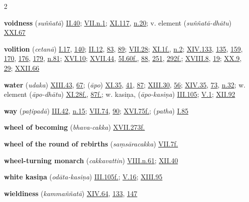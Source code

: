 \begin{multicols}{2}
\begin{vismHanging}
\par\textbf{voidness} (\emph{suññatā}) \hyperlink{II.40}{II.40}{}; \hyperlink{VII.n1}{VII.n.1}{}; \hyperlink{XI.117}{XI.117}{}, \hyperlink{XI.n20}{n.20}{}; v. element (\emph{suññatā-dhātu}) \hyperlink{XXI.67}{XXI.67}{}
\par\textbf{volition} (\emph{cetanā}) \hyperlink{I.17}{I.17}{}, \hyperlink{I.140}{140}{}; \hyperlink{II.12}{II.12}{}, \hyperlink{II.83}{83}{}, \hyperlink{II.89}{89}{}; \hyperlink{VII.28}{VII.28}{}; \hyperlink{XI.1}{XI.1f.}{}, \hyperlink{XI.n2}{n.2}{}; \hyperlink{XIV.133}{XIV.133}{}, \hyperlink{XIV.135}{135}{}, \hyperlink{XIV.159}{159}{}, \hyperlink{XIV.170}{170}{}, \hyperlink{XIV.176}{176}{}, \hyperlink{XIV.179}{179}{}, \hyperlink{XIV.n81}{n.81}{}; \hyperlink{XVI.10}{XVI.10}{}; \hyperlink{XVII.44}{XVII.44}{}, \hyperlink{XVII.5}{5}{}\hyperlink{I.60}{I.60f.}{}, \hyperlink{I.88}{88}{}, \hyperlink{I.251}{251}{}, \hyperlink{I.292}{292f.}{}; \hyperlink{XVIII.8}{XVIII.8}{}, \hyperlink{XVIII.19}{19}{}; \hyperlink{XX.9}{XX.9}{}, \hyperlink{XX.29}{29}{}; \hyperlink{XXII.66}{XXII.66}{}
\par\textbf{water} (\emph{udaka}) \hyperlink{XIII.43}{XIII.43}{}, \hyperlink{XIII.67}{67}{}; (\emph{āpo}) \hyperlink{XI.35}{XI.35}{}, \hyperlink{XI.41}{41}{}, \hyperlink{XI.87}{87}{}; \hyperlink{XIII.30}{XIII.30}{}, \hyperlink{XIII.56}{56}{}; \hyperlink{XIV.35}{XIV.35}{}, \hyperlink{XIV.73}{73}{}, \hyperlink{XIV.n32}{n.32}{}; w. element (\emph{āpo-dhātu}) \hyperlink{XI.28}{XI.28f.}{}, \hyperlink{XI.87}{87f.}{}; w. kasiṇa, (\emph{āpo-kasiṇa}) \hyperlink{III.105}{III.105}{}; \hyperlink{V.1}{V.1}{}; \hyperlink{XII.92}{XII.92}{}
\par\textbf{way} (\emph{paṭipadā}) \hyperlink{III.42}{III.42}{}, \hyperlink{III.n15}{n.15}{}; \hyperlink{VII.74}{VII.74}{}, \hyperlink{VII.90}{90}{}; \hyperlink{XVI.75}{XVI.75f.}{}; (\emph{patha}) \hyperlink{I.85}{I.85}{}
\par\textbf{wheel of becoming} (\emph{bhava-cakka}) \hyperlink{XVII.273}{XVII.273f.}{}
\par\textbf{wheel of the round of rebirths} (\emph{saṃsāracakka}) \hyperlink{VII.7}{VII.7f.}{}
\par\textbf{wheel-turning monarch} (\emph{cakkavattin}) \hyperlink{VIII.n61}{VIII.n.61}{}; \hyperlink{XII.40}{XII.40}{}
\par\textbf{white kasiṇa} (\emph{odāta-kasiṇa}) \hyperlink{III.105}{III.105f.}{}; \hyperlink{V.16}{V.16}{}; \hyperlink{XIII.95}{XIII.95}{}
\par\textbf{wieldiness} (\emph{kammaññatā}) \hyperlink{XIV.64}{XIV.64}{}, \hyperlink{XIV.133}{133}{}, \hyperlink{XIV.147}{147}{}

\end{vismHanging}
\end{multicols}
